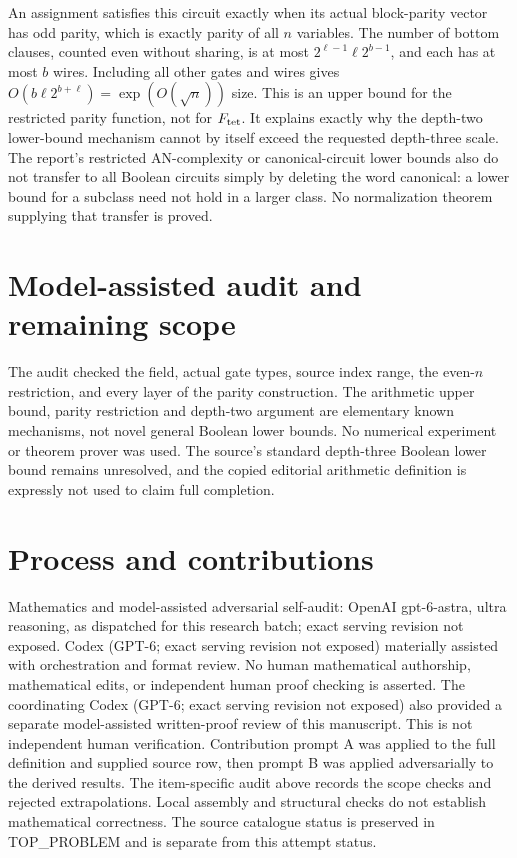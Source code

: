 \documentclass[11pt]{article}
\begin{document}
An assignment satisfies this circuit exactly when its actual
block-parity vector has odd parity, which is exactly parity of all
$n$ variables. The number of bottom clauses, counted even without
sharing, is at most
$2^{\ell-1}\ell2^{b-1}$, and each has at most $b$ wires.
Including all other gates and wires gives
$O(b\ell2^{b+\ell})=\exp(O(\sqrt n))$ size.
This is an upper bound for the restricted parity function, not for
$F_{\rm tet}$. It explains exactly why the depth-two lower-bound
mechanism cannot by itself exceed the requested depth-three scale.
The report's restricted AN-complexity or canonical-circuit lower
bounds also do not transfer to all Boolean circuits simply by deleting
the word canonical: a lower bound for a subclass need not hold in a
larger class. No normalization theorem supplying that transfer is proved.

\section{Model-assisted audit and remaining scope}
The audit checked the field, actual gate types, source index range,
the even-$n$ restriction, and every layer of the parity construction.
The arithmetic upper bound, parity restriction and depth-two argument
are elementary known mechanisms, not novel general Boolean lower bounds.
No numerical experiment or theorem prover was used. The source's
standard depth-three Boolean lower bound remains unresolved, and the
copied editorial arithmetic definition is expressly not used to claim
full completion.

\section{Process and contributions}
Mathematics and model-assisted adversarial self-audit: OpenAI gpt-6-astra, ultra reasoning, as dispatched for this research batch; exact serving revision not exposed. Codex (GPT-6; exact serving revision not exposed) materially assisted with orchestration and format review. No human mathematical authorship, mathematical edits, or independent human proof checking is asserted.
The coordinating Codex (GPT-6; exact serving revision not exposed) also provided a separate model-assisted written-proof review of this manuscript. This is not independent human verification.
Contribution prompt A was applied to the full definition and supplied source row, then prompt B was applied adversarially to the derived results. The item-specific audit above records the scope checks and rejected extrapolations. Local assembly and structural checks do not establish mathematical correctness. The source catalogue status is preserved in TOP\_PROBLEM and is separate from this attempt status.
\end{document}
